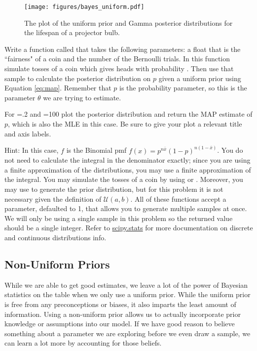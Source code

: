 \begin{figure}[H]
    \centering
    \texttt{[image: figures/bayes\_uniform.pdf]}
    \caption{The plot of the uniform prior and Gamma posterior distributions for the lifespan of a projector bulb.}
\end{figure}

\begin{problem}\label{prob:unif}
  Write a function called  that takes the following parameters:  a float that is the ``fairness" of a coin and  the number of the Bernoulli trials.
  In this function simulate  tosses of a coin which gives heads with probability .
  Then use that sample to calculate the posterior distribution on $p$ given a uniform prior using Equation \ref{eq:map}.
  Remember that $p$ is the probability parameter, so this is the parameter $\theta$ we are trying to estimate.

  For =.2 and =100 plot the posterior distribution and return the MAP estimate of $p$, which is also the MLE in this case.
  Be sure to give your plot a relevant title and axis labels.

  Hint: In this case, $f$ is the Binomial pmf $f(x) = p^{n\bar{x}}(1-p)^{n(1-\bar{x})}$.
  You do not need to calculate the integral in the denominator exactly; since you are using a finite approximation of the distributions, you may use a finite approximation of the integral.
  You may simulate the tosses of a coin by using  or .
  Moreover, you may use  to generate the prior distribution, but for this problem it is not necessary given the definition of $\mathcal{U}(a,b)$.
  All of these functions accept a  parameter, defaulted to 1, that allows you to generate multiple samples at once.
  We will only be using a single sample in this problem so the returned value should be a single integer.
  Refer to \href{https://docs.scipy.org/doc/scipy/tutorial/stats.html}{scipy.stats} for more documentation on discrete and continuous distributions info.
\end{problem}

\subsection*{Non-Uniform Priors}
While we are able to get good estimates, we leave a lot of the power of Bayesian statistics on the table when we only use a uniform prior.
While the uniform prior is free from any preconceptions or biases, it also imparts the least amount of information.
Using a non-uniform prior allows us to actually incorporate prior knowledge or assumptions into our model.
If we have good reason to believe something about a parameter we are exploring before we even draw a sample, we can learn a lot more by accounting for those beliefs.

